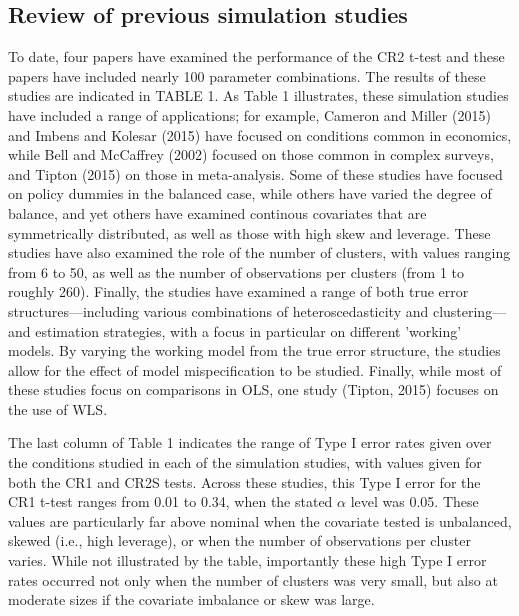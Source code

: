 \documentclass[12pt]{article}\usepackage[]{graphicx}\usepackage[]{color}
\begin{document}
\subsection{Review of previous simulation studies}

To date, four papers have examined the performance of the CR2 t-test and these papers have included nearly 100 parameter combinations. 
The results of these studies are indicated in TABLE 1. 
As Table 1 illustrates, these simulation studies have included a range of applications; for example, Cameron and Miller (2015) and Imbens and Kolesar (2015) have focused on conditions common in economics, while Bell and McCaffrey (2002) focused on those common in complex surveys, and Tipton (2015) on those in meta-analysis. 
Some of these studies have focused on policy dummies in the balanced case, while others have varied the degree of balance, and yet others have examined continous covariates that are symmetrically distributed, as well as those with high skew and leverage.
These studies have also examined the role of the number of clusters, with values ranging from 6 to 50, as well as the number of observations per clusters (from 1 to roughly 260).
Finally, the studies have examined a range of both true error structures---including various combinations of heteroscedasticity and clustering---and estimation strategies, with a focus in particular on different 'working' models. 
By varying the working model from the true error structure, the studies allow for the effect of model mispecification to be studied.
Finally, while most of these studies focus on comparisons in OLS, one study (Tipton, 2015) focuses on the use of WLS.

The last column of Table 1 indicates the range of Type I error rates given over the conditions studied in each of the simulation studies, with values given for both the CR1 and CR2S tests.
Across these studies, this Type I error for the CR1 t-test ranges from 0.01 to 0.34, when the stated $\alpha$ level was 0.05. 
These values are particularly far above nominal when the covariate tested is unbalanced, skewed (i.e., high leverage), or when the number of observations per cluster varies. 
While not illustrated by the table, importantly these high Type I error rates occurred not only when the number of clusters was very small, but also at moderate sizes if the covariate imbalance or skew was large. 
\end{document}
